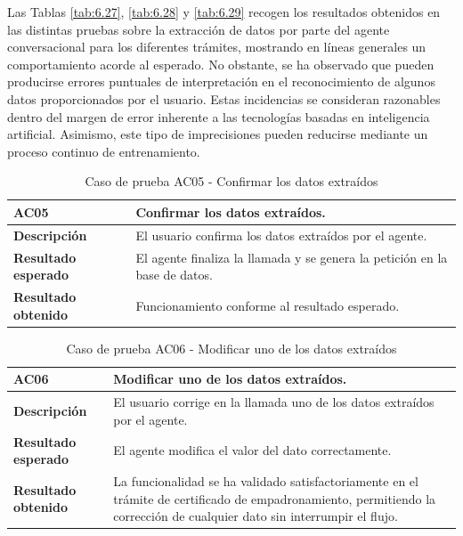     Las Tablas \ref{tab:6.27}, \ref{tab:6.28} y \ref{tab:6.29} recogen los resultados obtenidos en las distintas pruebas sobre la extracción de datos por parte del agente conversacional para los diferentes trámites, mostrando en líneas generales un comportamiento acorde al esperado. 
    No obstante, se ha observado que pueden producirse errores puntuales de interpretación en el reconocimiento de algunos datos proporcionados por el usuario. 
    Estas incidencias se consideran razonables dentro del margen de error inherente a las tecnologías basadas en inteligencia artificial. 
    Asimismo, este tipo de imprecisiones pueden reducirse mediante un proceso continuo de entrenamiento. 

    \begin{table}[H]
        \centering
        \begin{tabular}{|l|p{12cm}|}
        \hline
        \textbf{AC05} & Confirmar los datos extraídos. \\ \hline
        \textbf{Descripción} & El usuario confirma los datos extraídos por el agente. \\ \hline
        \textbf{Resultado esperado} & El agente finaliza la llamada y se genera la petición en la base de datos. \\ \hline
        \textbf{Resultado obtenido} & Funcionamiento conforme al resultado esperado. \\ \hline
        \end{tabular}
        \caption{Caso de prueba AC05 - Confirmar los datos extraídos}
    \end{table}

    \begin{table}[H]
        \centering
        \begin{tabular}{|l|p{12cm}|}
        \hline
        \textbf{AC06} & Modificar uno de los datos extraídos. \\ \hline
        \textbf{Descripción} & El usuario corrige en la llamada uno de los datos extraídos por el agente. \\ \hline
        \textbf{Resultado esperado} & El agente modifica el valor del dato correctamente. \\ \hline
        \textbf{Resultado obtenido} & La funcionalidad se ha validado satisfactoriamente en el trámite de certificado de empadronamiento, permitiendo la corrección de cualquier dato sin interrumpir el flujo. \\ \hline
        \end{tabular}
        \caption{Caso de prueba AC06 - Modificar uno de los datos extraídos}
    \end{table}

